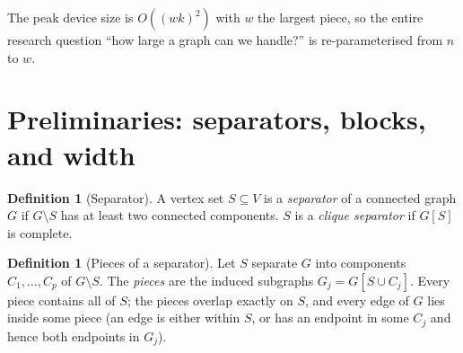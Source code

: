 \documentclass[11pt]{article}
\theoremstyle{definition}
\newtheorem{definition}[theorem]{Definition}
\theoremstyle{remark}
\begin{document}
\begin{center}
\end{center}

The peak device size is $O((wk)^2)$ with $w$ the largest piece, so the entire
research question ``how large a graph can we handle?'' is re-parameterised from $n$
to $w$.

\section{Preliminaries: separators, blocks, and width}

\begin{definition}[Separator]
A vertex set $S\subseteq V$ is a \emph{separator} of a connected graph $G$ if
$G\setminus S$ has at least two connected components. $S$ is a \emph{clique
separator} if $G[S]$ is complete.
\end{definition}

\begin{definition}[Pieces of a separator]
Let $S$ separate $G$ into components $C_1,\dots,C_p$ of $G\setminus S$. The
\emph{pieces} are the induced subgraphs $G_j = G[S\cup C_j]$. Every piece contains
all of $S$; the pieces overlap exactly on $S$, and every edge of $G$ lies inside
some piece (an edge is either within $S$, or has an endpoint in some $C_j$ and
hence both endpoints in $G_j$).
\end{definition}
\end{document}

